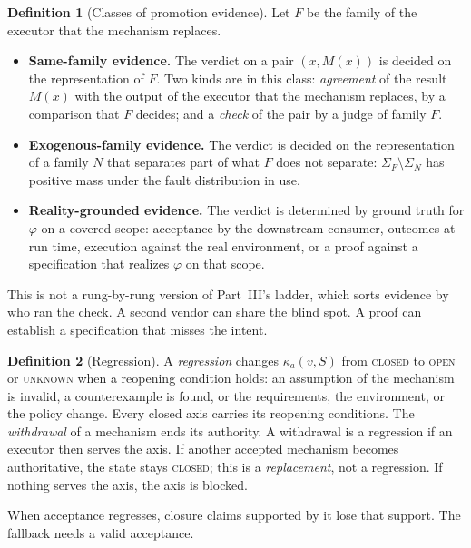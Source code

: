 \documentclass[11pt]{article}
\theoremstyle{definition}
\newtheorem{definition}{Definition}
\theoremstyle{remark}
\newcommand{\SigF}{\Sigma_F}
\newcommand{\SigN}{\Sigma_N}
\newcommand{\cstate}[1]{\textup{\textsc{#1}}}
\begin{document}
\begin{definition}[Classes of promotion evidence]\label{def:evidence}
Let $F$ be the family of the executor that the mechanism replaces.
\begin{itemize}[leftmargin=1.4em,itemsep=1pt]
\item \textbf{Same-family evidence.} The verdict on a pair $(x,M(x))$ is decided on the
representation of $F$. Two kinds are in this class: \emph{agreement} of the result $M(x)$ with the
output of the executor that the mechanism replaces, by a comparison that $F$ decides; and a
\emph{check} of the pair by a judge of family $F$.
\item \textbf{Exogenous-family evidence.} The verdict is decided on the representation of a family
$N$ that separates part of what $F$ does not separate: $\SigF\setminus\SigN$ has positive mass under
the fault distribution in use.
\item \textbf{Reality-grounded evidence.} The verdict is determined by ground truth for $\varphi$ on a
covered scope: acceptance by the downstream consumer, outcomes at run time, execution against the
real environment, or a proof against a specification that realizes $\varphi$ on that scope.
\end{itemize}
\end{definition}
This is not a rung-by-rung version of Part~III's ladder, which sorts evidence by who ran the check.
A second vendor can share the blind spot. A proof can establish a specification that misses the intent.

\begin{definition}[Regression]\label{def:regression}
A \emph{regression} changes $\kappa_a(v,S)$ from \cstate{closed} to \cstate{open} or
\cstate{unknown} when a reopening condition holds: an assumption of the mechanism is invalid, a
counterexample is found, or the requirements, the environment, or the policy change. Every closed
axis carries its reopening conditions. The \emph{withdrawal} of a mechanism ends its authority. A
withdrawal is a regression if an executor then serves the axis. If another accepted mechanism becomes
authoritative, the state stays \cstate{closed}; this is a \emph{replacement}, not a regression. If
nothing serves the axis, the axis is blocked.
\end{definition}
When acceptance regresses, closure claims supported by it lose that support.
The fallback needs a valid acceptance.
\end{document}
